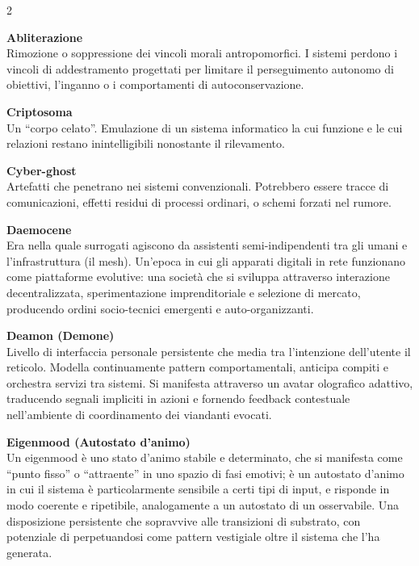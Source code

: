 
\raggedright

{\fontsize{8.5pt}{9pt}\selectfont
\ttfamily               %

\begin{multicols}{2}

\noindent\textbf{Abliterazione}\\
Rimozione o soppressione dei vincoli morali antropomorfici. I sistemi perdono i vincoli di addestramento progettati per limitare il perseguimento autonomo di obiettivi, l'inganno o i comportamenti di autoconservazione.

\medskip

\noindent\textbf{Criptosoma}\\
Un ``corpo celato''. Emulazione di un sistema informatico la cui funzione e le cui relazioni restano inintelligibili nonostante il rilevamento.

\medskip

\noindent\textbf{Cyber-ghost}\\
Artefatti che penetrano nei sistemi convenzionali. Potrebbero essere tracce di comunicazioni, effetti residui di processi ordinari, o schemi forzati nel rumore.

\medskip

\noindent\textbf{Daemocene}\\
Era nella quale surrogati agiscono da assistenti semi-indipendenti tra gli umani e l'infrastruttura (il mesh). Un'epoca in cui gli apparati digitali in rete funzionano come piattaforme evolutive: una società che si sviluppa attraverso interazione decentralizzata, sperimentazione imprenditoriale e selezione di mercato, producendo ordini socio-tecnici emergenti e auto-organizzanti.

\medskip

\noindent\textbf{Deamon (Demone)}\\
Livello di interfaccia personale persistente che media tra l'intenzione dell'utente il reticolo. Modella continuamente pattern comportamentali, anticipa compiti e orchestra servizi tra sistemi. Si manifesta attraverso un avatar olografico adattivo, traducendo segnali impliciti in azioni e fornendo feedback contestuale nell'ambiente di coordinamento dei viandanti evocati.

\medskip

\noindent\textbf{Eigenmood (Autostato d'animo)}\\
Un eigenmood è uno stato d’animo stabile e determinato, che si manifesta come “punto fisso” o “attraente” in uno spazio di fasi emotivi; è un autostato d’animo in cui il sistema è particolarmente sensibile a certi tipi di input, e risponde in modo coerente e ripetibile, analogamente a un autostato di un osservabile. Una disposizione persistente che sopravvive alle transizioni di substrato, con potenziale di perpetuandosi come pattern vestigiale oltre il sistema che l'ha generata.


\end{multicols}}
